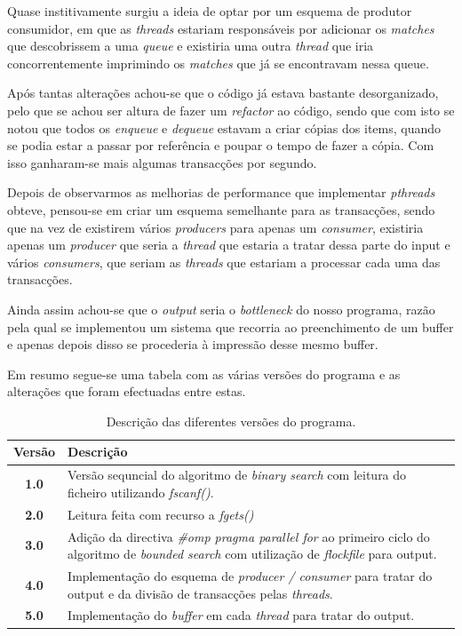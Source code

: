 \documentclass[a4paper]{article}
\begin{document}
Quase institivamente surgiu a ideia de optar por um esquema de produtor consumidor, em que as \textit{threads} estariam responsáveis por adicionar os \textit{matches} que descobrissem a uma \textit{queue} e existiria uma outra \textit{thread} que iria concorrentemente imprimindo os \textit{matches} que já se encontravam nessa queue.

Após tantas alterações achou-se que o código já estava bastante desorganizado, pelo que se achou ser altura de fazer um \textit{refactor} ao código, sendo que com isto se notou que todos os \textit{enqueue} e \textit{dequeue} estavam a criar cópias dos items, quando se podia estar a passar por referência e poupar o tempo de fazer a cópia. Com isso ganharam-se mais algumas transacções por segundo.

Depois de observarmos as melhorias de performance que implementar \textit{pthreads} obteve, pensou-se em criar um esquema semelhante para as transacções, sendo que na vez de existirem vários \textit{producers} para apenas um \textit{consumer}, existiria apenas um \textit{producer} que seria a \textit{thread} que estaria a tratar dessa parte do input e vários \textit{consumers}, que seriam as \textit{threads} que estariam a processar cada uma das transacções.

Ainda assim achou-se que o \textit{output} seria o \textit{bottleneck} do nosso programa, razão pela qual se implementou um sistema que recorria ao preenchimento de um buffer e apenas depois disso se procederia à impressão desse mesmo buffer.

Em resumo segue-se uma tabela com as várias versões do programa e as alterações que foram efectuadas entre estas.
\begin{table}[H]
	\begin{tabular}{| c | p{12cm} |} \hline
		\textbf{Versão}	&	\textbf{Descrição}	\\	\hline
		\textbf{1.0}	&	Versão sequncial do algoritmo de \textit{binary search} com leitura do ficheiro	utilizando \textit{fscanf()}.														\\	\hline
		\textbf{2.0}	&	Leitura feita com recurso a \textit{fgets()}																														\\	\hline
		\textbf{3.0}	&	Adição da directiva \textit{\#omp pragma parallel for} ao primeiro ciclo do algoritmo de \textit{bounded search} com utilização de \textit{flockfile} para output.	\\	\hline
		\textbf{4.0}	&	Implementação do esquema de \textit{producer / consumer} para tratar do output e da divisão de transacções pelas \textit{threads}.									\\	\hline
		\textbf{5.0}	&	Implementação do \textit{buffer} em cada \textit{thread} para tratar do output.																						\\	\hline
	\end{tabular}
	\caption{Descrição das diferentes versões do programa.}
\end{table}
\clearpage
\end{document}
